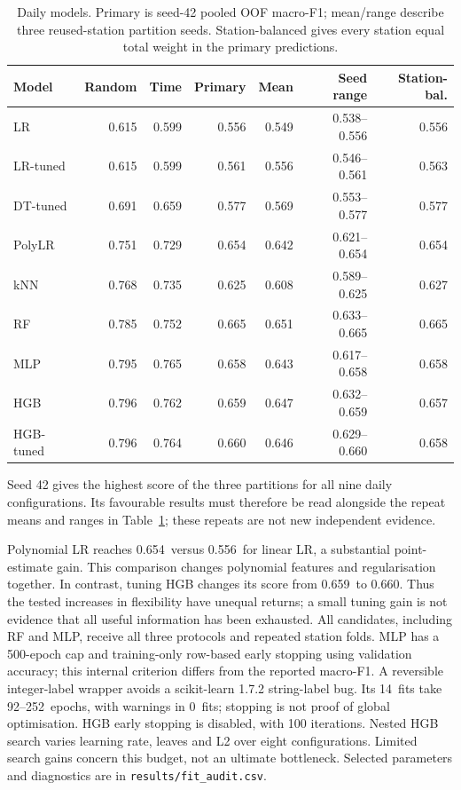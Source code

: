 \documentclass{article}
\newcommand{\DailyHGB}{0.659}
\newcommand{\DailyLR}{0.556}
\newcommand{\DailyPoly}{0.654}
\newcommand{\TunedHGB}{0.660}
\newcommand{\MlpFitCount}{14}
\newcommand{\MlpIterationRange}{92--252}
\newcommand{\MlpWarningFits}{0}
\begin{document}
\begin{table}[htbp]
\centering\small
\caption{Daily models. Primary is seed-42 pooled OOF macro-F1; mean/range describe three reused-station partition seeds. Station-balanced gives every station equal total weight in the primary predictions.}\label{tab:models}
\begin{tabular}{lrrrrrr}\toprule
Model & Random & Time & Primary & Mean & Seed range & Station-bal. \\ \midrule
LR & 0.615 & 0.599 & 0.556 & 0.549 & 0.538--0.556 & 0.556 \\
LR-tuned & 0.615 & 0.599 & 0.561 & 0.556 & 0.546--0.561 & 0.563 \\
DT-tuned & 0.691 & 0.659 & 0.577 & 0.569 & 0.553--0.577 & 0.577 \\
PolyLR & 0.751 & 0.729 & 0.654 & 0.642 & 0.621--0.654 & 0.654 \\
kNN & 0.768 & 0.735 & 0.625 & 0.608 & 0.589--0.625 & 0.627 \\
RF & 0.785 & 0.752 & 0.665 & 0.651 & 0.633--0.665 & 0.665 \\
MLP & 0.795 & 0.765 & 0.658 & 0.643 & 0.617--0.658 & 0.658 \\
HGB & 0.796 & 0.762 & 0.659 & 0.647 & 0.632--0.659 & 0.657 \\
HGB-tuned & 0.796 & 0.764 & 0.660 & 0.646 & 0.629--0.660 & 0.658 \\
\bottomrule\end{tabular}
\end{table}
Seed 42 gives the highest score of the three partitions for all nine daily configurations. Its favourable results must therefore be read alongside the repeat means and ranges in Table~\ref{tab:models}; these repeats are not new independent evidence.

Polynomial LR reaches \DailyPoly\ versus \DailyLR\ for linear LR, a substantial point-estimate gain. This comparison changes polynomial features and regularisation together. In contrast, tuning HGB changes its score from \DailyHGB\ to \TunedHGB. Thus the tested increases in flexibility have unequal returns; a small tuning gain is not evidence that all useful information has been exhausted.
All candidates, including RF and MLP, receive all three protocols and repeated station folds. MLP has a 500-epoch cap and training-only row-based early stopping using validation accuracy; this internal criterion differs from the reported macro-F1. A reversible integer-label wrapper avoids a scikit-learn 1.7.2 string-label bug. Its \MlpFitCount\ fits take \MlpIterationRange\ epochs, with warnings in \MlpWarningFits\ fits; stopping is not proof of global optimisation. HGB early stopping is disabled, with 100 iterations. Nested HGB search varies learning rate, leaves and L2 over eight configurations. Limited search gains concern this budget, not an ultimate bottleneck. Selected parameters and diagnostics are in \texttt{results/fit\_audit.csv}.
\end{document}
